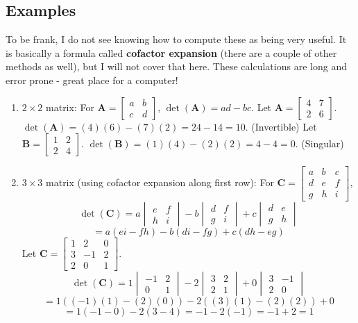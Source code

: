 \documentclass{article}
\newcommand{\mat}[1]{\bm{#1}}  %
\begin{document}
\subsection*{Examples}
To be frank, I do not see knowing how to compute these as being very useful. It is basically a formula called \textbf{cofactor expansion} (there are a couple of other methods as well), but I will not cover that here. These calculations are long and error prone - great place for a computer!
\begin{enumerate}
    \item $2 \times 2$ matrix: For $\mat{A} = \begin{bmatrix} a & b \\ c & d \end{bmatrix}$, $\det(\mat{A}) = ad - bc$.
    Let $\mat{A} = \begin{bmatrix} 4 & 7 \\ 2 & 6 \end{bmatrix}$. $\det(\mat{A}) = (4)(6) - (7)(2) = 24 - 14 = 10$. (Invertible)
    Let $\mat{B} = \begin{bmatrix} 1 & 2 \\ 2 & 4 \end{bmatrix}$. $\det(\mat{B}) = (1)(4) - (2)(2) = 4 - 4 = 0$. (Singular)

    \item $3 \times 3$ matrix (using cofactor expansion along first row): For $\mat{C} = \begin{bmatrix} a & b & c \\ d & e & f \\ g & h & i \end{bmatrix}$,
    \[ \det(\mat{C}) = a \begin{vmatrix} e & f \\ h & i \end{vmatrix} - b \begin{vmatrix} d & f \\ g & i \end{vmatrix} + c \begin{vmatrix} d & e \\ g & h \end{vmatrix} \]
    \[ = a(ei - fh) - b(di - fg) + c(dh - eg) \]
    Let $\mat{C} = \begin{bmatrix} 1 & 2 & 0 \\ 3 & -1 & 2 \\ 2 & 0 & 1 \end{bmatrix}$.
    \[ \det(\mat{C}) = 1 \begin{vmatrix} -1 & 2 \\ 0 & 1 \end{vmatrix} - 2 \begin{vmatrix} 3 & 2 \\ 2 & 1 \end{vmatrix} + 0 \begin{vmatrix} 3 & -1 \\ 2 & 0 \end{vmatrix} \]
    \[ = 1((-1)(1) - (2)(0)) - 2((3)(1) - (2)(2)) + 0 \]
    \[ = 1(-1 - 0) - 2(3 - 4) = -1 - 2(-1) = -1 + 2 = 1 \]
\end{enumerate}
\end{document}
